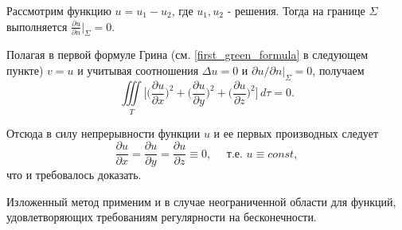 Рассмотрим функцию $u = u_1 - u_2$, где $u_1, u_2$ - решения. Тогда на границе $\Sigma$ выполняется $\frac{\partial u}{\partial n} \Big|_{\Sigma} = 0$.

Полагая в первой формуле Грина (см. \eqref{first_green_formula} в следующем пункте) $v = u$ и учитывая соотношения $\Delta u = 0$ и $\partial u / \partial n |_{\Sigma} = 0$, получаем 
\begin{equation*}
	 \iiint \limits_{T} \Bigg[\Bigg(\frac{\partial u}{\partial x}\Bigg)^2 + \Bigg(\frac{\partial u}{\partial y}\Bigg)^2 + \Bigg(\frac{\partial u}{\partial z}\Bigg)^2\Bigg] \, d\tau = 0.
\end{equation*}

Отсюда в силу непрерывности функции $u$ и ее первых производных следует 
\begin{equation*}
	\frac{\partial u}{\partial x} = \frac{\partial u}{\partial y} = \frac{\partial u}{\partial z} \equiv 0, \quad \text{ т.е. } u \equiv const,
\end{equation*}
что и требовалось доказать. 

Изложенный метод применим и в случае неограниченной области для функций, удовлетворяющих требованиям регулярности на бесконечности.

